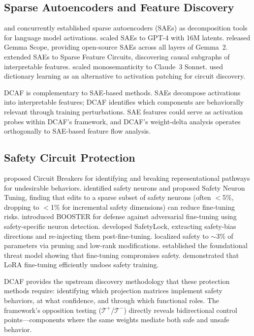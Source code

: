 \documentclass[11pt]{article}
\begin{document}
\subsection{Sparse Autoencoders and Feature Discovery}

\citet{cunningham2024sae} and \citet{bricken2023monosemanticity} concurrently established sparse autoencoders (SAEs) as decomposition tools for language model activations. \citet{gao2024scaling} scaled SAEs to GPT-4 with 16M latents. \citet{lieberum2024gemma} released Gemma Scope, providing open-source SAEs across all layers of Gemma~2. \citet{marks2025sparse} extended SAEs to Sparse Feature Circuits, discovering causal subgraphs of interpretable features. \citet{templeton2024scaling} scaled monosemanticity to Claude~3 Sonnet. \citet{he2024dictionary} used dictionary learning as an alternative to activation patching for circuit discovery.

DCAF is complementary to SAE-based methods. SAEs decompose activations into interpretable features; DCAF identifies which components are behaviorally relevant through training perturbations. SAE features could serve as activation probes within DCAF's framework, and DCAF's weight-delta analysis operates orthogonally to SAE-based feature flow analysis.

\subsection{Safety Circuit Protection}

\citet{zou2024circuitbreakers} proposed Circuit Breakers for identifying and breaking representational pathways for undesirable behaviors. \citet{han2025fgsn} identified safety neurons and proposed Safety Neuron Tuning, finding that edits to a sparse subset of safety neurons (often $<$5\%, dropping to $<$1\% for incremental safety dimensions) can reduce fine-tuning risks. \citet{huang2025booster} introduced BOOSTER for defense against adversarial fine-tuning using safety-specific neuron detection. \citet{zhu2025safetylock} developed SafetyLock, extracting safety-bias directions and re-injecting them post-fine-tuning. \citet{wei2024brittleness} localized safety to $\sim$3\% of parameters via pruning and low-rank modifications. \citet{qi2024finetuning} established the foundational threat model showing that fine-tuning compromises safety. \citet{lermen2023lora} demonstrated that LoRA fine-tuning efficiently undoes safety training.

DCAF provides the upstream discovery methodology that these protection methods require: identifying which projection matrices implement safety behaviors, at what confidence, and through which functional roles. The framework's opposition testing ($\mathcal{T}^+$/$\mathcal{T}^-$) directly reveals bidirectional control points---components where the same weights mediate both safe and unsafe behavior.
\end{document}
